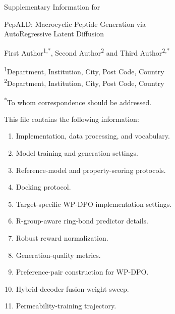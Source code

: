 \documentclass[12pt]{article}
\newcommand{\headingfont}{\normalfont}
\newcommand{\headingfont}{\sffamily}
\begin{document}
\thispagestyle{plain}
\vspace*{0pt}

{\headingfont\Large Supplementary Information for\par}

\vspace{0.55in}

{\headingfont\Large PepALD: Macrocyclic Peptide Generation via\\ AutoRegressive Latent Diffusion\par}

\vspace{0.35in}

First Author\textsuperscript{1,*}, Second Author\textsuperscript{2} and Third Author\textsuperscript{2,*}

\vspace{0.20in}

\textsuperscript{1}Department, Institution, City, Post Code, Country\\
\textsuperscript{2}Department, Institution, City, Post Code, Country

\textsuperscript{*}To whom correspondence should be addressed.

\vspace{0.35in}

This file contains the following information:

\begin{enumerate}[label=\arabic*., leftmargin=1.0in, labelsep=0.25in, itemsep=1pt, topsep=6pt]
\item Implementation, data processing, and vocabulary.
\item Model training and generation settings.
\item Reference-model and property-scoring protocols.
\item Docking protocol.
\item Target-specific WP-DPO implementation settings.
\item R-group-aware ring-bond predictor details.
\item Robust reward normalization.
\item Generation-quality metrics.
\item Preference-pair construction for WP-DPO.
\item Hybrid-decoder fusion-weight sweep.
\item Permeability-training trajectory.
\end{enumerate}

\clearpage
\end{document}
